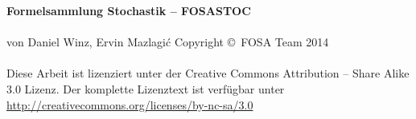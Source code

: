\thispagestyle{empty}
\noindent
\textbf{Formelsammlung Stochastik -- FOSASTOC} \\\\
von Daniel Winz, Ervin Mazlagi\'c
\vfill{}
\noindent
Copyright \copyright~FOSA Team 2014 \\\\
Diese Arbeit ist lizenziert unter der 
	Creative Commons Attribution -- Share Alike 3.0 
Lizenz. Der komplette Lizenztext ist verfügbar unter 
	\url{http://creativecommons.org/licenses/by-nc-sa/3.0}
\vfill{}
